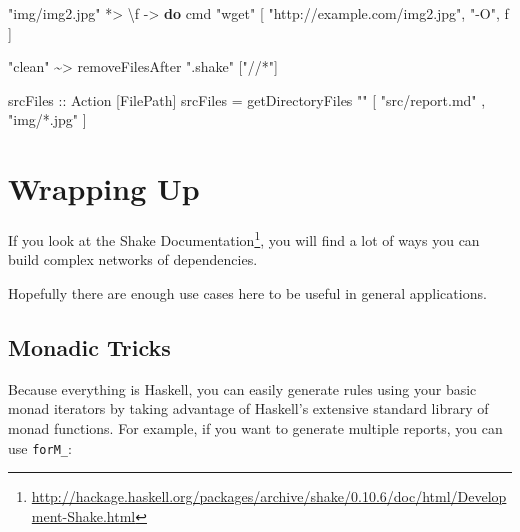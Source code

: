 \documentclass[]{article}
\newenvironment{Shaded}{}{}
\newcommand{\DataTypeTok}[1]{\textcolor[rgb]{0.56,0.13,0.00}{#1}}
\newcommand{\KeywordTok}[1]{\textcolor[rgb]{0.00,0.44,0.13}{\textbf{#1}}}
\newcommand{\NormalTok}[1]{#1}
\newcommand{\OperatorTok}[1]{\textcolor[rgb]{0.40,0.40,0.40}{#1}}
\newcommand{\OtherTok}[1]{\textcolor[rgb]{0.00,0.44,0.13}{#1}}
\newcommand{\StringTok}[1]{\textcolor[rgb]{0.25,0.44,0.63}{#1}}
\renewcommand{\href}[2]{#2\footnote{\url{#1}}}
\begin{document}
\begin{Shaded}
\begin{Highlighting}[]
    \StringTok{"img/img2.jpg"} \OperatorTok{*\textgreater{}}\NormalTok{ \textbackslash{}f }\OtherTok{{-}\textgreater{}} \KeywordTok{do}
\NormalTok{        cmd }\StringTok{"wget"}\NormalTok{ [ }\StringTok{"http://example.com/img2.jpg"}\NormalTok{, }\StringTok{"{-}O"}\NormalTok{, f ]}

    \StringTok{"clean"} \OperatorTok{\textasciitilde{}\textgreater{}}\NormalTok{ removeFilesAfter }\StringTok{".shake"}\NormalTok{ [}\StringTok{"//*"}\NormalTok{]}

\OtherTok{srcFiles ::} \DataTypeTok{Action}\NormalTok{ [}\DataTypeTok{FilePath}\NormalTok{]}
\NormalTok{srcFiles }\OtherTok{=}\NormalTok{ getDirectoryFiles }\StringTok{""}
\NormalTok{    [ }\StringTok{"src/report.md"}
\NormalTok{    , }\StringTok{"img/*.jpg"}\NormalTok{ ]}
\end{Highlighting}
\end{Shaded}

\section{Wrapping Up}\label{wrapping-up}

If you look at the
\href{http://hackage.haskell.org/packages/archive/shake/0.10.6/doc/html/Development-Shake.html}{Shake
Documentation}, you will find a lot of ways you can build complex networks of
dependencies.

Hopefully there are enough use cases here to be useful in general applications.

\subsection{Monadic Tricks}\label{monadic-tricks}

Because everything is Haskell, you can easily generate rules using your basic
monad iterators by taking advantage of Haskell's extensive standard library of
monad functions. For example, if you want to generate multiple reports, you can
use \texttt{forM\_}:
\end{document}
